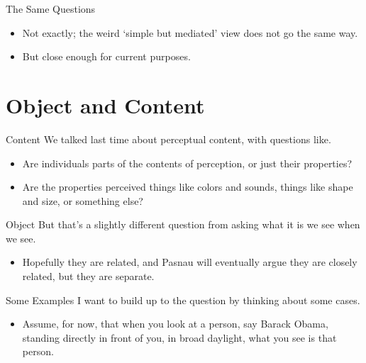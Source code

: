 \documentclass[
  17pt,
  letterpaper,
  ignorenonframetext,
  aspectratio=169,
  handout]{beamer}
\providecommand{\tightlist}{%
  \setlength{\itemsep}{0pt}\setlength{\parskip}{0pt}}\usepackage{longtable,booktabs,array}
\begin{document}
\begin{frame}{The Same Questions}
\protect\hypertarget{the-same-questions}{}
\begin{itemize}[<+->]
\tightlist
\item
  Not exactly; the weird `simple but mediated' view does not go the same
  way.
\item
  But close enough for current purposes.
\end{itemize}
\end{frame}

\hypertarget{object-and-content}{%
\section{Object and Content}\label{object-and-content}}

\begin{frame}{Content}
\protect\hypertarget{content}{}
We talked last time about perceptual content, with questions like.

\begin{itemize}[<+->]
\tightlist
\item
  Are individuals parts of the contents of perception, or just their
  properties?
\item
  Are the properties perceived things like colors and sounds, things
  like shape and size, or something else?
\end{itemize}
\end{frame}

\begin{frame}{Object}
\protect\hypertarget{object}{}
But that's a slightly different question from asking what it is we see
when we see.

\begin{itemize}[<+->]
\tightlist
\item
  Hopefully they are related, and Pasnau will eventually argue they are
  closely related, but they are separate.
\end{itemize}
\end{frame}

\begin{frame}{Some Examples}
\protect\hypertarget{some-examples}{}
I want to build up to the question by thinking about some cases.

\begin{itemize}[<+->]
\tightlist
\item
  Assume, for now, that when you look at a person, say Barack Obama,
  standing directly in front of you, in broad daylight, what you see is
  that person.
\end{itemize}
\end{frame}
\end{document}
